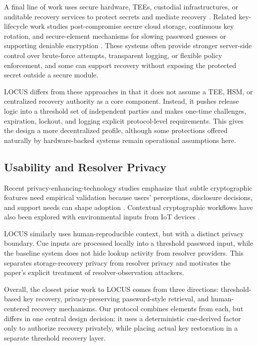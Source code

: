 A final line of work uses secure hardware, TEEs, custodial infrastructures, or auditable recovery services to protect secrets and mediate recovery \cite{Omega1996,Acsesor2022,WhatsAppBackup2023,CloudRecovery2025,MFAKeystore2025}. Related key-lifecycle work studies post-compromise secure cloud storage, continuous key rotation, and secure-element mechanisms for slowing password guesses or supporting deniable encryption \cite{Gloudemans2025Akeso,Lim2024QUICKeR,Hugenroth2024Sloth}. These systems often provide stronger server-side control over brute-force attempts, transparent logging, or flexible policy enforcement, and some can support recovery without exposing the protected secret outside a secure module.

\textsf{LOCUS} differs from these approaches in that it does not assume a TEE, HSM, or centralized recovery authority as a core component. Instead, it pushes release logic into a threshold set of independent parties and makes one-time challenges, expiration, lockout, and logging explicit protocol-level requirements. This gives the design a more decentralized profile, although some protections offered naturally by hardware-backed systems remain operational assumptions here.

\subsection{Usability and Resolver Privacy}

Recent privacy-enhancing-technology studies emphasize that subtle cryptographic features need empirical validation because users' perceptions, disclosure decisions, and support needs can shape adoption \cite{Fischer2025KeyTransparency,Dehling2024BiometricDisclosure,Demuth2024SupportPersonas}. Contextual cryptographic workflows have also been explored with environmental inputs from IoT devices \cite{Jois2024SocIoTy}.

\textsf{LOCUS} similarly uses human-reproducible context, but with a distinct privacy boundary. Cue inputs are processed locally into a threshold password input, while the baseline system does not hide lookup activity from resolver providers. This separates storage-recovery privacy from resolver privacy and motivates the paper's explicit treatment of resolver-observation attackers.

Overall, the closest prior work to \textsf{LOCUS} comes from three directions: threshold-based key recovery, privacy-preserving password-style retrieval, and human-centered recovery mechanisms. Our protocol combines elements from each, but differs in one central design decision: it uses a deterministic cue-derived factor only to authorize recovery privately, while placing actual key restoration in a separate threshold recovery layer.
